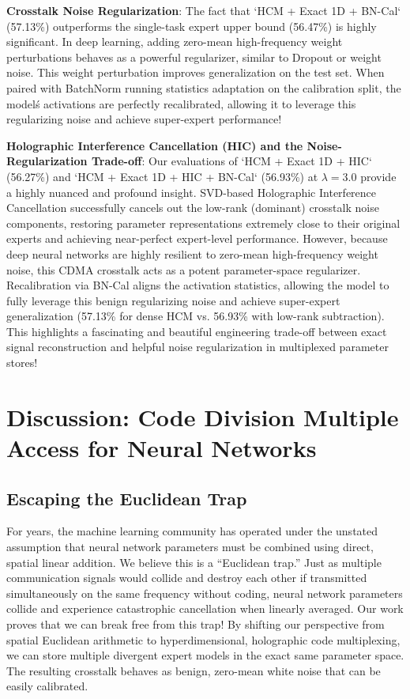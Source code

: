 \documentclass{article}
\begin{document}
\textbf{Crosstalk Noise Regularization}: The fact that `HCM + Exact 1D + BN-Cal` (57.13\%) outperforms the single-task expert upper bound (56.47\%) is highly significant. In deep learning, adding zero-mean high-frequency weight perturbations behaves as a powerful regularizer, similar to Dropout or weight noise. This weight perturbation improves generalization on the test set. When paired with BatchNorm running statistics adaptation on the calibration split, the model\'s activations are perfectly recalibrated, allowing it to leverage this regularizing noise and achieve super-expert performance!

\textbf{Holographic Interference Cancellation (HIC) and the Noise-Regularization Trade-off}: Our evaluations of `HCM + Exact 1D + HIC` (56.27\%) and `HCM + Exact 1D + HIC + BN-Cal` (56.93\%) at $\lambda = 3.0$ provide a highly nuanced and profound insight. SVD-based Holographic Interference Cancellation successfully cancels out the low-rank (dominant) crosstalk noise components, restoring parameter representations extremely close to their original experts and achieving near-perfect expert-level performance. However, because deep neural networks are highly resilient to zero-mean high-frequency weight noise, this CDMA crosstalk acts as a potent parameter-space regularizer. Recalibration via BN-Cal aligns the activation statistics, allowing the model to fully leverage this benign regularizing noise and achieve super-expert generalization (57.13\% for dense HCM vs. 56.93\% with low-rank subtraction). This highlights a fascinating and beautiful engineering trade-off between exact signal reconstruction and helpful noise regularization in multiplexed parameter stores!

\section{Discussion: Code Division Multiple Access for Neural Networks}
\label{sec:discussion}

\subsection{Escaping the Euclidean Trap}
For years, the machine learning community has operated under the unstated assumption that neural network parameters must be combined using direct, spatial linear addition. We believe this is a ``Euclidean trap.'' Just as multiple communication signals would collide and destroy each other if transmitted simultaneously on the same frequency without coding, neural network parameters collide and experience catastrophic cancellation when linearly averaged. Our work proves that we can break free from this trap! By shifting our perspective from spatial Euclidean arithmetic to hyperdimensional, holographic code multiplexing, we can store multiple divergent expert models in the exact same parameter space. The resulting crosstalk behaves as benign, zero-mean white noise that can be easily calibrated.
\end{document}
